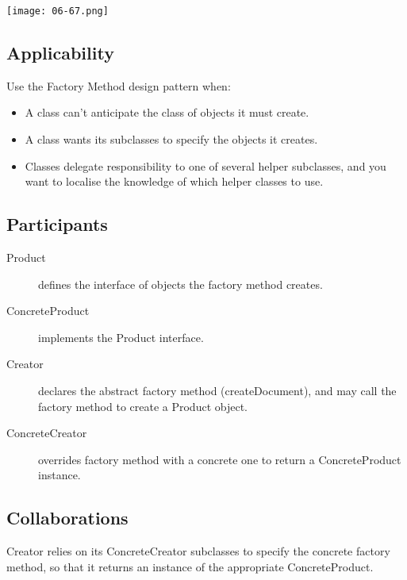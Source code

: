 \begin{center}
\texttt{[image: 06-67.png]}
\end{center}


\subsection{Applicability}

Use the Factory Method design pattern when:


\begin{itemize}
\item A class can't anticipate the class of objects it must create.
\item A class wants its subclasses to specify the objects it creates.
\item Classes delegate responsibility to one of several helper subclasses, and you want to localise the knowledge of which helper classes to use.
\end{itemize}

\subsection{Participants}

\begin{description}
\item[Product]
	
	defines the interface of objects the factory method creates.

\item[ConcreteProduct]

	implements the Product interface.

\item[Creator]
	
	declares the abstract factory method (createDocument), and may call the factory method to create a Product object.

\item[ConcreteCreator]
	
	overrides factory method with a concrete one to return a ConcreteProduct instance.
\end{description}

\subsection{Collaborations}

Creator relies on its ConcreteCreator subclasses to specify the concrete factory method, so that it returns an instance of the appropriate ConcreteProduct.


